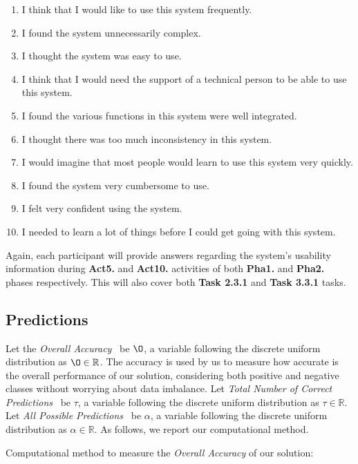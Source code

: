 \begin{enumerate}
\item I think that I would like to use this system frequently.
\item I found the system unnecessarily complex.
\item I thought the system was easy to use.
\item I think that I would need the support of a technical person to be able to use this system.
\item I found the various functions in this system were well integrated.
\item I thought there was too much inconsistency in this system.
\item I would imagine that most people would learn to use this system very quickly.
\item I found the system very cumbersome to use.
\item I felt very confident using the system.
\item I needed to learn a lot of things before I could get going with this system.
\end{enumerate}

Again, each participant will provide answers regarding the system's usability information during {\bf Act5.} and {\bf Act10.} activities of both {\bf Pha1.} and {\bf Pha2.} phases respectively. This will also cover both {\bf Task 2.3.1} and {\bf Task 3.3.1} tasks.

\subsection{Predictions}

Let the {\it Overall Accuracy}~\cite{ashraf2018comparative, li2018digital} be $\O$, a variable following the discrete uniform distribution as $\O \in \mathbb{R}$. The accuracy is used by us to measure how accurate is the overall performance of our solution, considering both positive and negative classes without worrying about data imbalance. Let {\it Total Number of Correct Predictions}~\cite{ashraf2018comparative, li2018digital} be $\tau$, a variable following the discrete uniform distribution as $\tau \in \mathbb{R}$. Let {\it All Possible Predictions}~\cite{ashraf2018comparative, li2018digital} be $\alpha$, a variable following the discrete uniform distribution as $\alpha \in \mathbb{R}$. As follows, we report our computational method.

\hfill

Computational method to measure the {\it Overall Accuracy} of our solution:

